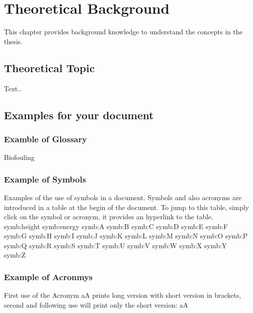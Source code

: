 \documentclass[class=scrbook, crop=false]{standalone}
\begin{document}
\chapter{Theoretical Background}
\label{Chapter::Theoretical_Background} %
This chapter provides background knowledge to understand the concepts in the thesis.

\section{Theoretical Topic}
\label{Section::Theoretical_Topic}
    Text..

\section{Examples for your document}
    
    \subsection{Examble of Glossary}
    \gls{Biofouling}
    
    \subsection{Example of Symbols}
    Examples of the use of symbols in a document. Symbols and also acronyms are introduced in a table at the begin of the document. To jump to this table, simply click on the symbol or acronym, it provides an hyperlink to the table.\\
    \gls{symb:height}
    \gls{symb:energy}
    \gls{symb:A}
    \gls{symb:B}
    \gls{symb:C}
    \gls{symb:D}
    \gls{symb:E}
    \gls{symb:F}
    \gls{symb:G}
    \gls{symb:H}
    \gls{symb:I}
    \gls{symb:J}
    \gls{symb:K}
    \gls{symb:L}
    \gls{symb:M}
    \gls{symb:N}
    \gls{symb:O}
    \gls{symb:P}
    \gls{symb:Q}
    \gls{symb:R}
    \gls{symb:S}
    \gls{symb:T}
    \gls{symb:U}
    \gls{symb:V}
    \gls{symb:W}
    \gls{symb:X}
    \gls{symb:Y}
    \gls{symb:Z}
    
    \subsection{Example of Acronmys}
    First use of the Acronym \gls{aA} prints long version with short version in brackets, second and following use will print only the short version: \gls{aA}
    
\end{document}
